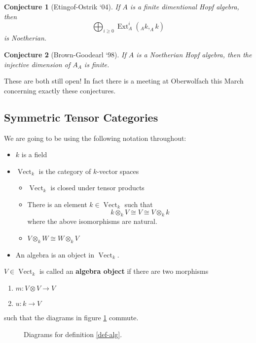\documentclass[12pt]{article}
\theoremstyle{break}
\theoremstyle{nonumberbreak}
\theoremstyle{changebreak}
\theoremstyle{break}
\theoremstyle{nonumberbreak}
\theoremstyle{nonumberplain}
\newtheorem{conj}{Conjecture}
\theoremstyle{change}
\DeclareMathOperator{\Ext}{Ext}
\DeclareMathOperator{\id}{id}
\newcommand*{\Vectk}{\operatorname{Vect}_k}
\begin{document}
\begin{conj}[Etingof-Ostrik `04]
	If $A$ is a finite dimentional Hopf algebra, then 
	\[\bigoplus_{i\ge 0}\Ext_A^i(_Ak, _Ak)\]
	is Noetherian.
\end{conj}

\begin{conj}[Brown-Goodearl `98]
	If $A$ is a Noetherian Hopf algebra, then the injective dimension of $A_A$ is finite.
\end{conj}

These are both still open! In fact there is a meeting at Oberwolfach this March concerning
exactly these conjectures.

\subsection{Symmetric Tensor Categories}
We are going to be using the following notation throughout:
\begin{itemize}
	\item $k$ is a field
	\item $\Vectk$ is the category of $k$-vector spaces
	\begin{itemize}
		\item $\Vectk$ is closed under tensor products
		\item There is an element $k\in\Vectk$ such that
		\[k\otimes_k V\cong V\cong V\otimes_k k\]
		where the above isomorphisms are natural.
		\item $V\otimes_k W\cong W\otimes_k V$
	\end{itemize}
	\item An algebra is an object in $\Vectk$.
\end{itemize}

\begin{defn}\label{def-alg}
	$V\in\Vectk$ is called an \textbf{algebra object} if there are two morphisms
	\begin{enumerate}
		\item $m:V\otimes V\to V$
		\item $u:k\to V$
	\end{enumerate}
	such that the diagrams in figure \ref{fig-alg} commute.
	
\end{defn}
\begin{figure}\label{fig-alg}
	\caption{Diagrams for definition \ref{def-alg}.}
\end{figure}
\end{document}
